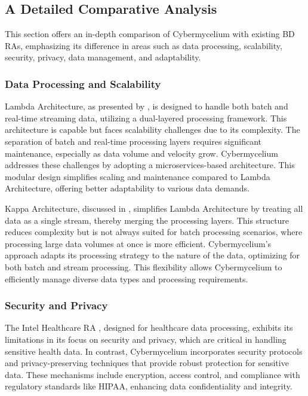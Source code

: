 \documentclass[review]{elsarticle}
\begin{document}
\subsection{A Detailed Comparative Analysis}
This section offers an in-depth comparison of Cybermycelium with existing BD RAs, emphasizing its difference in areas such as data processing, scalability, security, privacy, data management, and adaptability.

\subsubsection{Data Processing and Scalability}

Lambda Architecture, as presented by \cite{kiran2015lambda}, is designed to handle both batch and real-time streaming data, utilizing a dual-layered processing framework. This architecture is capable but faces scalability challenges due to its complexity. The separation of batch and real-time processing layers requires significant maintenance, especially as data volume and velocity grow. Cybermycelium addresses these challenges by adopting a microservices-based architecture. This modular design simplifies scaling and maintenance compared to Lambda Architecture, offering better adaptability to various data demands.

Kappa Architecture, discussed in \cite{kreps2014questioning}, simplifies Lambda Architecture by treating all data as a single stream, thereby merging the processing layers. This structure reduces complexity but is not always suited for batch processing scenarios, where processing large data volumes at once is more efficient. Cybermycelium's approach adapts its processing strategy to the nature of the data, optimizing for both batch and stream processing. This flexibility allows Cybermycelium to efficiently manage diverse data types and processing requirements.



\subsubsection{Security and Privacy}
The Intel Healthcare RA \cite{SikoraWohlfeld2014}, designed for healthcare data processing, exhibits its limitations in its focus on security and privacy, which are critical in handling sensitive health data. In contrast, Cybermycelium incorporates security protocols and privacy-preserving techniques that provide robust protection for sensitive data. These mechanisms include encryption, access control, and compliance with regulatory standards like HIPAA, enhancing data confidentiality and integrity.
\end{document}
